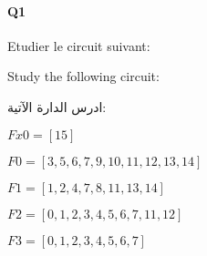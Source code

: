 

\pagebreak

\paragraph{Q1}



Etudier le circuit suivant:



Study the following circuit:

\begin{arab}[utf]
ادرس الدارة الآتية:
\end{arab}

 

$Fx0 = [15]$



$F0 = [3, 5, 6, 7, 9, 10, 11, 12, 13, 14]$



$F1 = [1, 2, 4, 7, 8, 11, 13, 14]$



$F2 = [0, 1, 2, 3, 4, 5, 6, 7, 11, 12]$



$F3 = [0, 1, 2, 3, 4, 5, 6, 7]$



